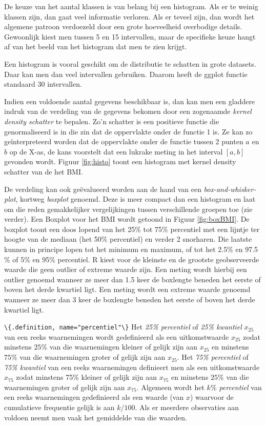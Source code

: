 \documentclass[
  12pt,dutch,coursenotes]{book}
\newcommand{\passthrough}[1]{#1}
\begin{document}
De keuze van het aantal klassen is van belang bij een histogram. Als er te
weinig klassen zijn, dan gaat veel informatie verloren. Als er teveel zijn,
dan wordt het algemene patroon verdoezeld door een grote hoeveelheid overbodige
details. Gewoonlijk kiest men tussen 5 en 15 intervallen, maar de specifieke
keuze hangt af van het beeld van het histogram dat men te zien krijgt.

Een histogram is vooral geschikt om de distributie te schatten in grote datasets. Daar kan men dan veel intervallen gebruiken. Daarom heeft de ggplot functie standaard 30 intervallen.

Indien een voldoende aantal gegevens beschikbaar is, dan kan men een
gladdere indruk van de verdeling van de gegevens bekomen door een zogenaamde \emph{kernel density schatter} te bepalen. Zo'n schatter is een positieve functie die genormaliseerd is in die zin dat de oppervlakte onder de functie 1 is. Ze kan zo geïnterpreteerd worden dat de oppervlakte onder de functie tussen 2 punten \(a\) en \(b\) op de X-as, de kans voorstelt dat een lukrake meting in het interval \([a,b]\) gevonden wordt. Figuur \ref{fig:histo} toont een histogram met kernel density schatter van de het BMI.

De verdeling kan ook geëvalueerd worden aan de hand van een \emph{box-and-whisker-plot}, kortweg \emph{boxplot} genoemd. Deze is
meer compact dan een histogram en laat om die reden gemakkelijker
vergelijkingen tussen verschillende groepen toe (zie verder). Een Boxplot voor het BMI wordt getoond in Figuur \ref{fig:boxBMI}. De boxplot toont een
doos lopend van het 25\% tot 75\% percentiel met een lijntje ter hoogte van de
mediaan (het 50\% percentiel) en verder 2 snorharen. Die laatste kunnen in principe lopen tot het
minimum en maximum, of tot het 2.5\% en 97.5 \% of 5\% en 95\% percentiel.
R kiest voor de kleinste en de grootste geobserveerde waarde die geen
outlier of extreme waarde zijn. Een meting wordt hierbij een outlier genoemd
wanneer ze meer dan 1.5 keer de boxlengte beneden het eerste of boven het
derde kwartiel ligt. Een meting wordt een extreme waarde genoemd wanneer ze
meer dan 3 keer de boxlengte beneden het eerste of boven het derde kwartiel
ligt.

\passthrough{\lstinline!\{.definition, name="percentiel"\}!}
Het \emph{25\% percentiel} of \emph{25\% kwantiel} \(x_{25}\) van een
reeks waarnemingen wordt gedefinieerd als een uitkomstwaarde \(x_{25}\) zodat
minstens \(25\%\) van die waarnemingen kleiner of gelijk zijn aan \(x_{25}\) en
minstens \(75\%\) van die waarnemingen groter of gelijk zijn aan \(x_{25}\). Het
\emph{75\% percentiel} of \emph{75\% kwantiel} van een reeks
waarnemingen definieert men als een uitkomstwaarde \(x_{75}\) zodat minstens 75\%
kleiner of gelijk zijn aan \(x_{75}\) en minstens \(25\%\) van die waarnemingen
groter of gelijk zijn aan \(x_{75}\). Algemeen wordt het \emph{\(k\%\)
percentiel} van een reeks waarnemingen gedefinieerd als een waarde (van \(x\))
waarvoor de cumulatieve frequentie gelijk is aan \(k/100.\) Als er meerdere
observaties aan voldoen neemt men vaak het gemiddelde van die waarden.
\end{document}

